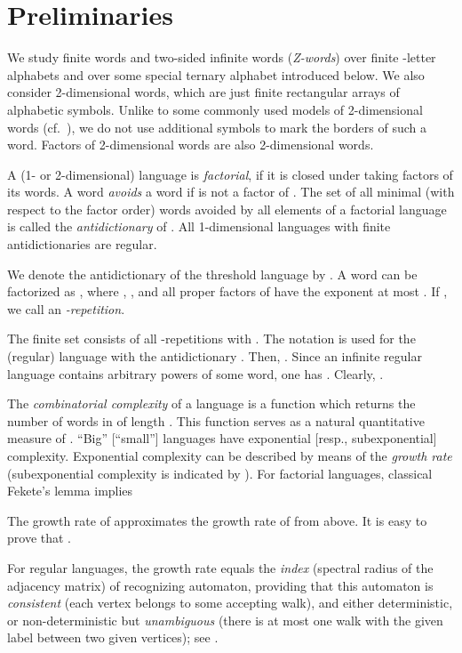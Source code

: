 \documentclass[submission,copyright]{eptcs}\providecommand{\event}{WORDS 2011}
\begin{document}
\section {Preliminaries}

We study finite words and two-sided infinite words (\textit{Z-words}) over finite -letter alphabets  and over some special ternary alphabet introduced below. We also consider 2-dimensional words, which are just finite rectangular arrays of alphabetic symbols. Unlike to some commonly used models of 2-dimensional words (cf.~\cite{2D}), we do not use additional symbols to mark the borders of such a word. Factors of 2-dimensional words are also 2-dimensional words.

A (1- or 2-dimensional) language is \textit{factorial}, if it is closed under taking factors of its words. A word  \textit{avoids} a word  if  is not a factor of . The set of all minimal (with respect to the factor order) words avoided by all elements of a factorial language  is called the {\it antidictionary} of . All 1-dimensional languages with finite antidictionaries are regular.

We denote the antidictionary of the threshold language  by . A word  can be factorized as , where , , and all proper factors of  have the exponent at most . If , we call  an \textit{-repetition}.

The finite set  consists of all -repetitions with . The notation  is used for the (regular) language with the antidictionary . Then, . Since an infinite regular language contains arbitrary powers of some word, one has . Clearly, .

The \textit{combinatorial complexity} of a language  is a function  which returns the number of words in  of length . This function serves as a natural quantitative measure of . ``Big'' [``small''] languages have exponential [resp., subexponential] complexity. Exponential complexity can be described by means of the \textit{growth rate}  (subexponential complexity is indicated by ). For factorial languages, classical Fekete's lemma implies 

The growth rate of  approximates the growth rate of  from above. It is easy to prove that .

For regular languages, the growth rate equals the \textit{index} (spectral radius of the adjacency matrix) of recognizing automaton, providing that this automaton is \textit{consistent} (each vertex belongs to some accepting walk), and either deterministic, or non-deterministic but \textit{unambiguous} (there is at most one walk with the given label between two given vertices); see \cite{Sh1}.
\end{document}
